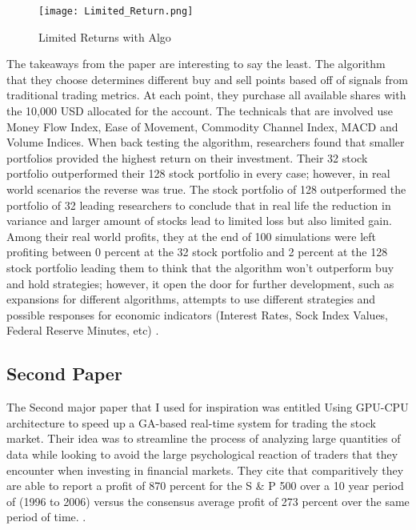 \documentclass[paper=letter, fontsize=11pt]{scrartcl}
\numberwithin{equation}{section}		%
\numberwithin{figure}{section}			%
\numberwithin{table}{section}				%
\begin{document}
\begin{spacing}{2}
\begin{figure}[Returns]
\centering
\texttt{[image: Limited\_Return.png]}
\caption{Limited Returns with Algo}
\end{figure}
The takeaways from the paper are interesting to say the least. The algorithm that they choose determines different buy and sell points based off of signals from traditional trading metrics. At each point, they purchase all available shares with the 10,000 USD allocated for the account. The technicals that are involved use Money Flow Index, Ease of Movement, Commodity Channel Index, MACD and Volume Indices. When back testing the algorithm, researchers found that smaller portfolios provided the highest return on their investment. Their 32 stock portfolio outperformed their 128 stock portfolio in every case; however, in real world scenarios the reverse was true. The stock portfolio of 128 outperformed the portfolio of 32 leading researchers to conclude that in real life the reduction in variance and larger amount of stocks lead to limited loss but also limited gain. Among their real world profits, they at the end of 100 simulations were left profiting between 0 percent at the 32 stock portfolio and 2 percent at the 128 stock portfolio leading them to think that the algorithm won't outperform buy and hold strategies; however, it open the door for further development, such as expansions for different algorithms, attempts to use different strategies and possible responses for economic indicators (Interest Rates, Sock Index Values, Federal Reserve Minutes, etc) \cite{STS}. 

\subsection{Second Paper}

The Second major paper that I used for inspiration was entitled Using GPU-CPU architecture to speed up a GA-based real-time system for trading the stock market. Their idea was to streamline the process of analyzing large quantities of data while looking to avoid the large psychological reaction of traders that they encounter when investing in financial markets. They cite that comparitively they are able to report a profit of 870 percent for the S \& P 500 over a 10 year period of (1996 to 2006) versus the consensus average profit of 273 percent over the same period of time. \cite{GA}.


\end{spacing}
\end{document}
